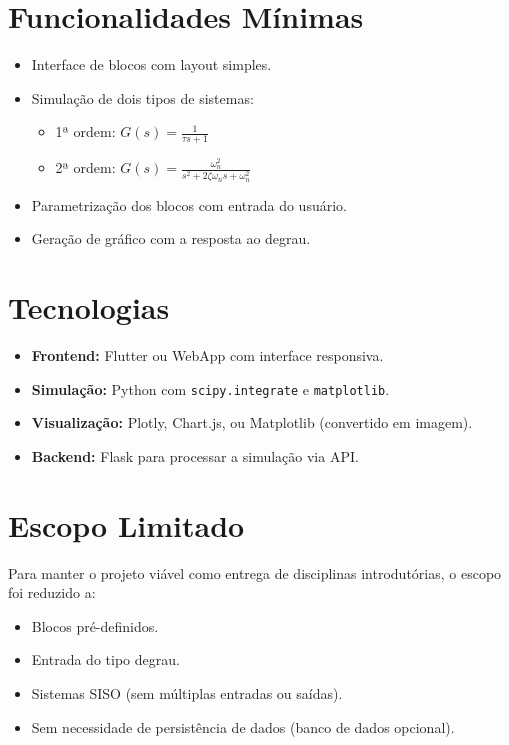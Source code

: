 \documentclass[12pt]{article}
\begin{document}
\section*{Funcionalidades Mínimas}

\begin{itemize}
    \item Interface de blocos com layout simples.
    \item Simulação de dois tipos de sistemas:
    \begin{itemize}
        \item 1ª ordem: \( G(s) = \frac{1}{\tau s + 1} \)
        \item 2ª ordem: \( G(s) = \frac{\omega_n^2}{s^2 + 2\zeta\omega_n s + \omega_n^2} \)
    \end{itemize}
    \item Parametrização dos blocos com entrada do usuário.
    \item Geração de gráfico com a resposta ao degrau.
\end{itemize}

\section*{Tecnologias}

\begin{itemize}
    \item \textbf{Frontend:} Flutter ou WebApp com interface responsiva.
    \item \textbf{Simulação:} Python com \texttt{scipy.integrate} e \texttt{matplotlib}.
    \item \textbf{Visualização:} Plotly, Chart.js, ou Matplotlib (convertido em imagem).
    \item \textbf{Backend:} Flask para processar a simulação via API.
\end{itemize}

\section*{Escopo Limitado}

Para manter o projeto viável como entrega de disciplinas introdutórias, o escopo foi reduzido a:
\begin{itemize}
    \item Blocos pré-definidos.
    \item Entrada do tipo degrau.
    \item Sistemas SISO (sem múltiplas entradas ou saídas).
    \item Sem necessidade de persistência de dados (banco de dados opcional).
\end{itemize}
\end{document}
